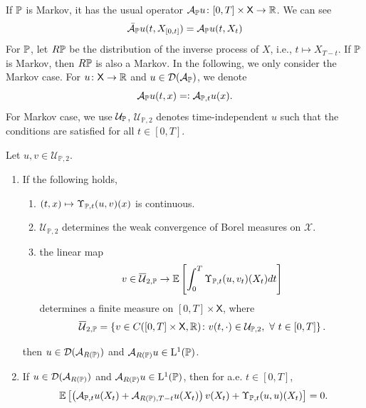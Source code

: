 If $\mathbb{P}$ is Markov, it has the usual operator $\mathcal{A}_{\mathbb{P}} u \colon [0,T] \times \mathsf{X} \rightarrow \mathbb{R}$. We can see
\begin{equation*}
    \bar{\mathcal{A}}_{\mathbb{P}} u(t, X_{[0,t]}) =  \mathcal{A}_{\mathbb{P}} u(t,X_t)
\end{equation*}
For $\mathbb{P}$, let $R\mathbb{P}$ be the distribution of the inverse process of $X$, i.e., $t \mapsto X_{T - t}$. If $\mathbb{P}$ is Markov, then $R\mathbb{P}$ is also a Markov. In the following, we only consider the Markov case. For $u \colon \mathsf{X} \rightarrow \mathbb{R}$ and $u \in \mathcal{D}(\mathcal{A}_{\mathbb{P}})$, we denote
\begin{equation*}
    \mathcal{A}_{\mathbb{P}}u(t,x) =\vcentcolon \mathcal{A}_{\mathbb{P},t}u(x).
\end{equation*}
For Markov case, we use $\mathcal{U}_{\mathbb{P}}$, $\mathcal{U}_{\mathbb{P}, 2}$ denotes time-independent $u$ such that the conditions are satisfied for all $t \in [0,T]$.

\begin{thm}
    Let $u,v \in \mathcal{U}_{\mathbb{P}, 2}$.
    \begin{enumerate}[label=(\alph{*})]
        \item If the following holds,
        \begin{enumerate}[label=(\roman*)]
            \item $(t,x) \mapsto \Upsilon_{\mathbb{P},t}(u,v)(x)$ is continuous.
            \item $\mathcal{U}_{\mathbb{P}, 2}$ determines the weak convergence of Borel measures on $\mathcal{X}$.
            \item the linear map
            \begin{equation*}
                v \in \overline{\mathcal{U}}_{2,\mathbb{P}} \rightarrow \mathbb{E}\left[\int_0^T \Upsilon_{\mathbb{P},t}(u,v_t)(X_t)dt\right]
            \end{equation*}
            determines a finite measure on $[0,T] \times \mathsf{X}$, where
            \begin{equation*}
                \overline{\mathcal{U}}_{2,\mathbb{P}} = \left\{v \in C([0,T] \times \mathsf{X},\mathbb{R}) \colon v(t,\cdot) \in \mathcal{U}_{\mathbb{P}, 2},~\forall~t \in [0,T]\right\}.
            \end{equation*}
        \end{enumerate}
        then $u \in \mathcal{D}(\mathcal{A}_{R(\mathbb{P})})$ and $\mathcal{A}_{R(\mathbb{P})} u \in \mathrm{L}^1(\mathbb{P})$. 

        \item If $u \in \mathcal{D}(\mathcal{A}_{R(\mathbb{P})})$ and $\mathcal{A}_{R(\mathbb{P})} u \in \mathrm{L}^1(\mathbb{P})$, then for a.e. $t \in [0,T]$,
        \begin{equation*}
            \mathbb{E}\left[\left(\mathcal{A}_{\mathbb{P},t} u(X_t) + \mathcal{A}_{R(\mathbb{P}),T-t}u(X_t)\right)v(X_t) + \Upsilon_{\mathbb{P},t}(u,u)(X_t)\right] = 0.
        \end{equation*}
    \end{enumerate}
\end{thm}
 
